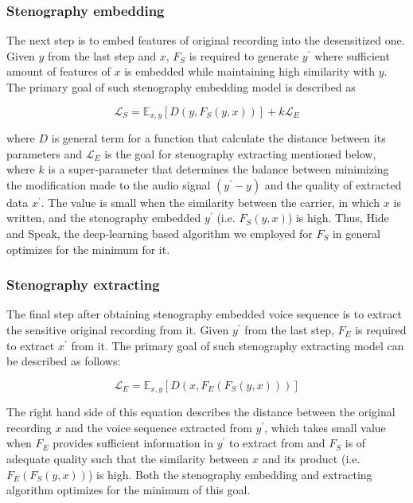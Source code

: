 \documentclass[journal]{IEEEtran} %
\begin{document}
\subsubsection{Stenography embedding}

The next step is to embed features of original recording into the desensitized one. Given $y$ from the last step and $x$, $F_S$ is required to generate $y^{\prime}$ where sufficient amount of features of $x$ is embedded while maintaining high similarity with $y$. The primary goal of such stenography embedding model is described as

\begin{equation}
    \label{eqn:embed_loss}
    \mathcal{L}_S = \mathbb{E}_{x, y}[D(y, F_S(y, x))] + k\mathcal{L}_E
\end{equation}

where $D$ is general term for a function that calculate the distance between its parameters and $\mathcal{L}_E$ is the goal for stenography extracting mentioned below, where $k$ is a super-parameter that determines the balance between minimizing the modification made to the audio signal $(y^{\prime} - y)$ and the quality of extracted data $x^{\prime}$. The value is small when the similarity between the carrier, in which $x$ is written, and the stenography embedded $y^{\prime}$ (i.e. $F_S(y, x)$) is high. Thus, Hide and Speak\cite{has}, the deep-learning based algorithm we employed for $F_S$ in general optimizes for the minimum for it.

\subsubsection{Stenography extracting}

The final step after obtaining stenography embedded voice sequence is to extract the sensitive original recording from it. Given $y^{\prime}$ from the last step, $F_E$ is required to extract $x^{\prime}$ from it. The primary goal of such stenography extracting model can be described as follows:

\begin{equation}
    \label{eqn:extract_loss}
    \mathcal{L}_E = \mathbb{E}_{x, y}[D(x, F_E(F_S(y, x)))]
\end{equation}

The right hand side of this equation describes the distance between the original recording $x$ and the voice sequence extracted from $y^{\prime}$, which takes small value when $F_E$ provides sufficient information in $y^{\prime}$ to extract from and $F_S$ is of adequate quality such that the similarity between $x$ and its product (i.e. $F_E(F_S(y, x))$) is high. Both the stenography embedding and extracting algorithm optimizes for the minimum of this goal.
\end{document}
